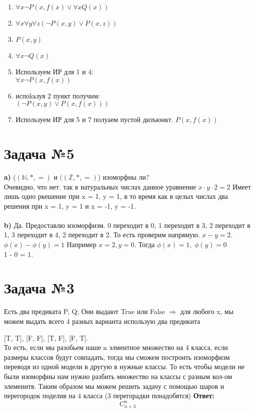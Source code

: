 \documentclass[a4paper,12pt]{article} %
\begin{document}
\begin{enumerate}
    \item $\forall x \neg P(x, f(x) \vee \forall x Q(x))$
    \item $\forall x \forall y \forall z (\neg P(x, y) \vee P(x, z))$
    \item $P(x, y)$
    \item $\forall x \neg Q(x)$
    \item Используем ИР для 1 и 4: \\
    $\forall x \neg P(x, f(x))$
    \item испоkьзуя 2 пункт получим: \\
    $(\neg P(x, y) \vee P(x, f(x)))$
    \item Используем ИР для 5 и 7 полуаем пустой дизъюнкт.
    $P(x, f(x))$
    
\end{enumerate}

\section*{Задача №5}
\textbf{a)}
($(\mathbb{N}, *, =)$ и $((\mathbb{Z}, *, =)$) изоморфны ли? \\
Очевидно, что нет. так в натуральных числах данное уравнение $x \cdot y \cdot 2 = 2$
Имеет лишь одно ркешение при x = 1, y = 1, в то время как в целых числах два решения при x = 1, y = 1 
и x = -1, y = -1. \\ \\
\textbf{b)}
Да. Предоставлю изоморфизм.
0 переходит в 0, 1 переходит в 3, 2 переходит в 1, 3 переходит в 4, 2 переходит в 2.
То есть проверим напрямую. $x - y = 2.$ \\
$\phi(x) - \phi(y) = 1$
Например $x = 2, y = 0.$
Тогда 
$\phi(x) = 1, \; \phi(y) = 0 $\\ 
1 - 0 = 1.
\section*{Задача №3}
Есть два предиката P, Q;
Они выдают True или False $\Rightarrow$ для любого x, мы можем выдать всего 
4 разных варианта использую два предикита 

[T, T], [F, F], [T, F], [F, T]. 
\\
То есть, если мы разобьем наше n элментное множество на 4 класса,
если размеры классов будут совпадать,
тогда мы сможем
построить изоморфизм переводя из одной модели в другую в нужные классы. То есть чтобы 
модели не были изоморфны нам нужно разбить множество на классы с разным кол-ом элеменитв.
Таким образом мы можем решить задачу с помощью шаров и перегородок поделив на 4 класса (3 перегорадки понадобятся)
\textbf{Ответ:}
\[
  C^n_{n+3}  
\]
\end{document}
